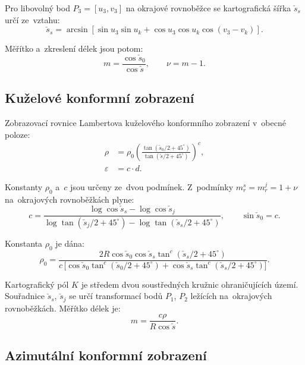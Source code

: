\documentclass[11pt, a4paper]{article}
\begin{document}
Pro libovolný bod $P_3 = [u_3, v_3]$ na okrajové rovnoběžce se kartografická šířka $\check{s}_s$ určí ze~vztahu:
\begin{equation}
    \check{s}_s = \arcsin\!\left[\sin u_3 \sin u_k + \cos u_3 \cos u_k \cos(v_3 - v_k)\right].
\end{equation}

Měřítko a~zkreslení délek jsou potom:
\begin{equation}
    m = \frac{\cos \check{s}_0}{\cos \check{s}}, \qquad \nu = m - 1.
\end{equation}

\subsection{Kuželové konformní zobrazení}

Zobrazovací rovnice Lambertova kuželového konformního zobrazení v~obecné poloze:
\begin{align}
    \rho &= \rho_0 \left( \frac{\tan(\check{s}_0/2 + 45^{\circ})}{\tan(\check{s}/2 + 45^{\circ})} \right)^{\!c},\\
    \varepsilon &= c \cdot d.
\end{align}

Konstanty $\rho_0$ a~$c$ jsou určeny ze~dvou podmínek. Z~podmínky $m_r^s = m_r^j = 1+\nu$ na~okrajových rovnoběžkách plyne:
\begin{equation}
    c = \frac{\log\cos \check{s}_s - \log\cos \check{s}_j}{\log\tan(\check{s}_j/2 + 45^{\circ}) - \log\tan(\check{s}_s/2 + 45^{\circ})},
    \qquad \sin \check{s}_0 = c.
\end{equation}

Konstanta $\rho_0$ je dána:
\begin{equation}
    \rho_0 = \frac{2R \cos \check{s}_0 \cos \check{s}_s \tan^c(\check{s}_s/2 + 45^{\circ})}{c\,\big[\cos \check{s}_0 \tan^c(\check{s}_0/2 + 45^{\circ}) + \cos \check{s}_s \tan^c(\check{s}_s/2 + 45^{\circ})\big]}.
\end{equation}

Kartografický pól $K$ je středem dvou soustředných kružnic ohraničujících území. Souřadnice $\check{s}_s$, $\check{s}_j$ se určí transformací bodů $P_1$, $P_2$ ležících na~okrajových rovnoběžkách. Měřítko délek je:
\begin{equation}
    m = \frac{c \rho}{R \cos \check{s}}.
\end{equation}

\subsection{Azimutální konformní zobrazení}
\end{document}
